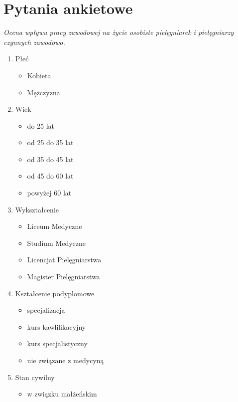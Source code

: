 \documentclass[a4paper,12pt,twoside,openright]{mwrep}
\begin{document}
\listoftables
\listoffigures




\chapter{Pytania ankietowe}
\label{app:ankieta}

\textit{Ocena wpływu pracy zawodowej na życie osobiste pielęgniarek i pielęgniarzy czynnych zawodowo.}

\begin{enumerate}[label=(\roman*)]
	\item{Płeć}
		\begin{itemize}
			\item{Kobieta}
			\item{Mężczyzna}
		\end{itemize}
	\item{Wiek}
		\begin{itemize}
			\item{do 25 lat}
			\item{od 25 do 35 lat}
			\item{od 35 do 45 lat}
			\item{od 45 do 60 lat}
			\item{powyżej 60 lat}
		\end{itemize}
	\item{Wykształcenie}
		\begin{itemize}
			\item{Liceum Medyczne}
			\item{Studium Medyczne}
			\item{Licencjat Pielęgniarstwa}
			\item{Magister Pielęgniarstwa}
		\end{itemize}
	\item{Kształcenie podyplomowe}
		\begin{itemize}
			\item{specjalizacja}
			\item{kurs kawlifikacyjny}
			\item{kurs specjalistyczny}
			\item{nie związane z medycyną}
		\end{itemize}
	\item{Stan cywilny}
		\begin{itemize}
			\item{w związku małżeńskim}

\end{itemize}
\end{enumerate}
\end{document}
